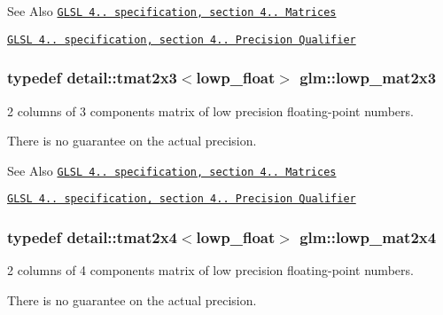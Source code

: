 \begin{DoxySeeAlso}{See Also}
\href{http://www.opengl.org/registry/doc/GLSLangSpec.4.20.8.pdf}{\tt G\-L\-S\-L 4.. specification, section 4.. Matrices} 

\href{http://www.opengl.org/registry/doc/GLSLangSpec.4.20.8.pdf}{\tt G\-L\-S\-L 4.. specification, section 4.. Precision Qualifier} 
\end{DoxySeeAlso}
\hypertarget{group__core__precision_ga094f5266f214da7ef32e49df6432f4fa}{
\subsubsection[{lowp\-\_\-mat2x3}]{\setlength{\rightskip}{0pt plus 5cm}typedef detail\-::tmat2x3$<$lowp\-\_\-float$>$ {\bf glm\-::lowp\-\_\-mat2x3}}}\label{group__core__precision_ga094f5266f214da7ef32e49df6432f4fa}


2 columns of 3 components matrix of low precision floating-\/point numbers. 

There is no guarantee on the actual precision.

\begin{DoxySeeAlso}{See Also}
\href{http://www.opengl.org/registry/doc/GLSLangSpec.4.20.8.pdf}{\tt G\-L\-S\-L 4.. specification, section 4.. Matrices} 

\href{http://www.opengl.org/registry/doc/GLSLangSpec.4.20.8.pdf}{\tt G\-L\-S\-L 4.. specification, section 4.. Precision Qualifier} 
\end{DoxySeeAlso}
\hypertarget{group__core__precision_ga800238e68eee3279c7a38d4f3cd005e8}{
\subsubsection[{lowp\-\_\-mat2x4}]{\setlength{\rightskip}{0pt plus 5cm}typedef detail\-::tmat2x4$<$lowp\-\_\-float$>$ {\bf glm\-::lowp\-\_\-mat2x4}}}\label{group__core__precision_ga800238e68eee3279c7a38d4f3cd005e8}


2 columns of 4 components matrix of low precision floating-\/point numbers. 

There is no guarantee on the actual precision.

